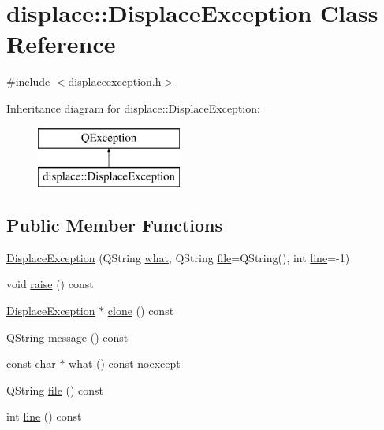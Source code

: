 \hypertarget{classdisplace_1_1_displace_exception}{}\section{displace\+::Displace\+Exception Class Reference}
\label{classdisplace_1_1_displace_exception}


{\ttfamily \#include $<$displaceexception.\+h$>$}

Inheritance diagram for displace\+::Displace\+Exception\+:\begin{figure}[H]
\begin{center}
\leavevmode
\includegraphics[height=2.000000cm]{d4/dfd/classdisplace_1_1_displace_exception}
\end{center}
\end{figure}
\subsection*{Public Member Functions}
\begin{DoxyCompactItemize}
\item 
\mbox{\hyperlink{classdisplace_1_1_displace_exception_aa6724fc24720385ef5e68119dc53dc3c}{Displace\+Exception}} (Q\+String \mbox{\hyperlink{classdisplace_1_1_displace_exception_a294e20a59d65e83f161bcc6af4a75bce}{what}}, Q\+String \mbox{\hyperlink{classdisplace_1_1_displace_exception_a1ced7c5734053b8ac385a643b5910bad}{file}}=Q\+String(), int \mbox{\hyperlink{classdisplace_1_1_displace_exception_a546a3256ce724f7022965b8490e9e08a}{line}}=-\/1)
\item 
void \mbox{\hyperlink{classdisplace_1_1_displace_exception_af759187d6750f273d94ceff33604dfab}{raise}} () const
\item 
\mbox{\hyperlink{classdisplace_1_1_displace_exception}{Displace\+Exception}} $\ast$ \mbox{\hyperlink{classdisplace_1_1_displace_exception_a1d302252417f1a8946e61f22056cf745}{clone}} () const
\item 
Q\+String \mbox{\hyperlink{classdisplace_1_1_displace_exception_a4b4a79475ab8b96f17124a749460df80}{message}} () const
\item 
const char $\ast$ \mbox{\hyperlink{classdisplace_1_1_displace_exception_a294e20a59d65e83f161bcc6af4a75bce}{what}} () const noexcept
\item 
Q\+String \mbox{\hyperlink{classdisplace_1_1_displace_exception_a1ced7c5734053b8ac385a643b5910bad}{file}} () const
\item 
int \mbox{\hyperlink{classdisplace_1_1_displace_exception_a546a3256ce724f7022965b8490e9e08a}{line}} () const
\end{DoxyCompactItemize}
